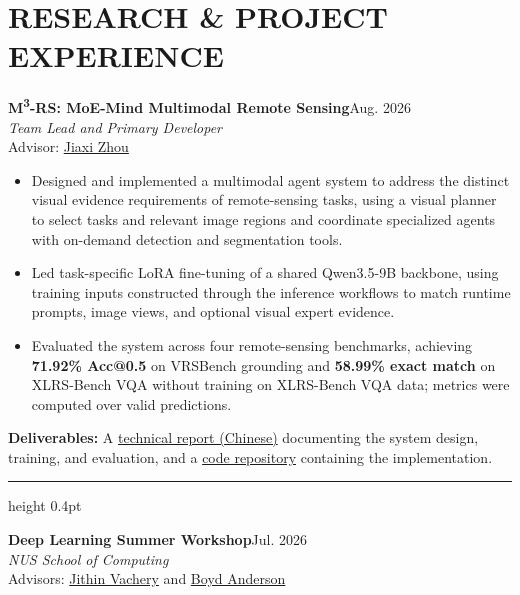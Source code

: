 \documentclass[10pt,a4paper]{article}
\begin{document}
\section{RESEARCH \& PROJECT EXPERIENCE}
\textbf{M\textsuperscript{3}-RS: MoE-Mind Multimodal Remote Sensing}\hfill Aug. 2026\\
\textit{Team Lead and Primary Developer}\\
Advisor: \href{https://cse-sinclab.hust.edu.cn/info/1014/1183.htm}{Jiaxi Zhou}
\begin{itemize}
\item Designed and implemented a multimodal agent system to address the distinct visual evidence requirements of remote-sensing tasks, using a visual planner to select tasks and relevant image regions and coordinate specialized agents with on-demand detection and segmentation tools.
\item Led task-specific LoRA fine-tuning of a shared Qwen3.5-9B backbone, using training inputs constructed through the inference workflows to match runtime prompts, image views, and optional visual expert evidence.
\item Evaluated the system across four remote-sensing benchmarks, achieving \textbf{71.92\% Acc@0.5} on VRSBench grounding and \textbf{58.99\% exact match} on XLRS-Bench VQA without training on XLRS-Bench VQA data; metrics were computed over valid predictions.
\end{itemize}

\textbf{Deliverables:} A \href{https://cufe-hust.github.io/materials/m3-technical-report-zh.pdf}{technical report (Chinese)} documenting the system design, training, and evaluation, and a \href{https://github.com/CuFe-hust/M3}{code repository} containing the implementation.

\par\vspace{10pt}
{\color{black!25}\hrule height 0.4pt}
\vspace{10pt}
\textbf{Deep Learning Summer Workshop}\hfill Jul. 2026\\
\textit{NUS School of Computing}\\
Advisors: \href{https://www.comp.nus.edu.sg/~jithin/index.html}{Jithin Vachery} and \href{https://www.comp.nus.edu.sg/cs/people/boyd/}{Boyd Anderson}
\end{document}
